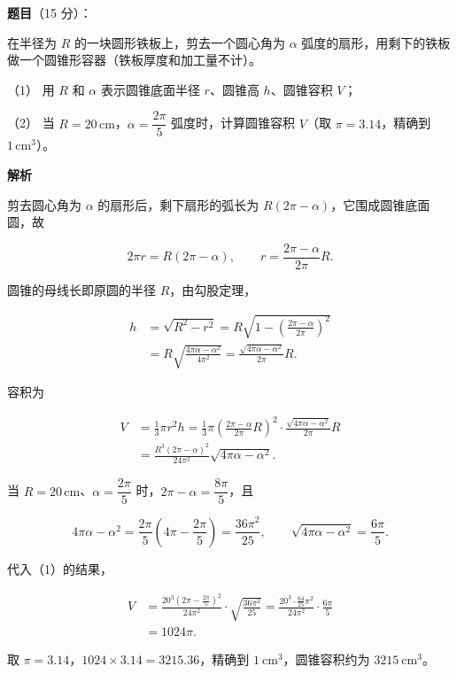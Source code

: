 \begin{answer}

\textbf{题目}（15 分）：

在半径为 $R$ 的一块圆形铁板上，剪去一个圆心角为 $\alpha$ 弧度的扇形，用剩下的铁板做一个圆锥形容器（铁板厚度和加工量不计）。

（1） 用 $R$ 和 $\alpha$ 表示圆锥底面半径 $r$、圆锥高 $h$、圆锥容积 $V$；

（2） 当 $R=20\,\mathrm{cm}$，$\alpha=\dfrac{2\pi}{5}$ 弧度时，计算圆锥容积 $V$（取 $\pi=3.14$，精确到 $1\,\mathrm{cm^3}$）。

\textbf{解析}


剪去圆心角为 $\alpha$ 的扇形后，剩下扇形的弧长为 $R(2\pi-\alpha)$，它围成圆锥底面圆，故

\nopagebreak[4]
\[
2\pi r=R(2\pi-\alpha),
\qquad
r=\frac{2\pi-\alpha}{2\pi}R.
\]

圆锥的母线长即原圆的半径 $R$，由勾股定理，

\nopagebreak[4]
\[
\begin{aligned}
h&=\sqrt{R^2-r^2}
=R\sqrt{1-\left(\frac{2\pi-\alpha}{2\pi}\right)^2}\\
&=R\sqrt{\frac{4\pi\alpha-\alpha^2}{4\pi^2}}
=\frac{\sqrt{4\pi\alpha-\alpha^2}}{2\pi}R.
\end{aligned}
\]

容积为

\nopagebreak[4]
\[
\begin{aligned}
V&=\frac13\pi r^2h
=\frac13\pi\left(\frac{2\pi-\alpha}{2\pi}R\right)^2\cdot
\frac{\sqrt{4\pi\alpha-\alpha^2}}{2\pi}R\\
&=\frac{R^3(2\pi-\alpha)^2}{24\pi^2}\sqrt{4\pi\alpha-\alpha^2}.
\end{aligned}
\]


当 $R=20\,\mathrm{cm}$、$\alpha=\dfrac{2\pi}{5}$ 时，$2\pi-\alpha=\dfrac{8\pi}{5}$，且

\nopagebreak[4]
\[
4\pi\alpha-\alpha^2
=\frac{2\pi}{5}\left(4\pi-\frac{2\pi}{5}\right)
=\frac{36\pi^2}{25},
\qquad
\sqrt{4\pi\alpha-\alpha^2}=\frac{6\pi}{5}.
\]

代入（1）的结果，

\nopagebreak[4]
\[
\begin{aligned}
V&=\frac{20^3\left(2\pi-\frac{2\pi}{5}\right)^2}{24\pi^2}\cdot
\sqrt{\frac{36\pi^2}{25}}
=\frac{20^3\cdot\frac{64}{25}\pi^2}{24\pi^2}\cdot\frac{6\pi}{5}\\
&=1024\pi.
\end{aligned}
\]

取 $\pi=3.14$，$1024\times3.14=3215.36$，精确到 $1\ \mathrm{cm^3}$，圆锥容积约为 $3215\ \mathrm{cm^3}$。



\end{answer}
